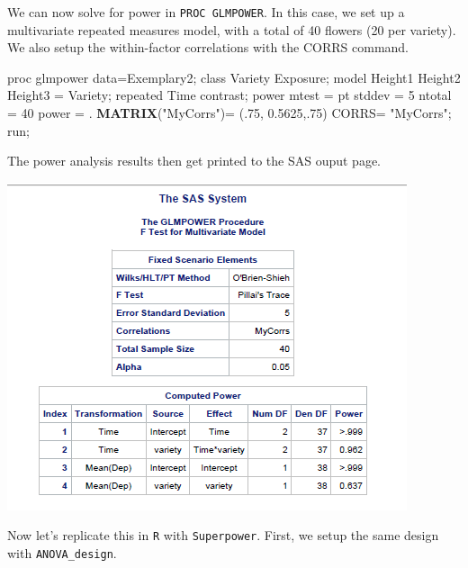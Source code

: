 \documentclass[
]{book}
\newenvironment{Shaded}{\begin{snugshade}}{\end{snugshade}}
\newcommand{\DecValTok}[1]{\textcolor[rgb]{0.00,0.00,0.81}{#1}}
\newcommand{\FloatTok}[1]{\textcolor[rgb]{0.00,0.00,0.81}{#1}}
\newcommand{\KeywordTok}[1]{\textcolor[rgb]{0.13,0.29,0.53}{\textbf{#1}}}
\newcommand{\NormalTok}[1]{#1}
\newcommand{\StringTok}[1]{\textcolor[rgb]{0.31,0.60,0.02}{#1}}
\begin{document}
We can now solve for power in \texttt{PROC\ GLMPOWER}. In this case, we set up a multivariate repeated measures model, with a total of 40 flowers (20 per variety). We also setup the within-factor correlations with the CORRS command.

\begin{Shaded}
\begin{Highlighting}[]
\NormalTok{proc glmpower data=Exemplary2;}
\NormalTok{class Variety Exposure;}
\NormalTok{model Height1 Height2 Height3 =}\StringTok{ }\NormalTok{Variety;}
\NormalTok{repeated Time contrast;}
\NormalTok{power}
\NormalTok{mtest =}\StringTok{ }\NormalTok{pt}
\NormalTok{stddev =}\StringTok{ }\DecValTok{5}
\NormalTok{ntotal =}\StringTok{ }\DecValTok{40}
\NormalTok{power =}\StringTok{ }\NormalTok{.}
\KeywordTok{MATRIX}\NormalTok{(}\StringTok{"MyCorrs"}\NormalTok{)=}\StringTok{ }\NormalTok{(.}\DecValTok{75}\NormalTok{,}
                    \FloatTok{0.5625}\NormalTok{,.}\DecValTok{75}\NormalTok{)}
\NormalTok{CORRS=}\StringTok{ "MyCorrs"}\NormalTok{;}
\NormalTok{run;}
\end{Highlighting}
\end{Shaded}

The power analysis results then get printed to the SAS ouput page.

\includegraphics{screenshots/sas_2x3repeated.png}

Now let's replicate this in \texttt{R} with \texttt{Superpower}. First, we setup the same design with \texttt{ANOVA\_design}.
\end{document}

